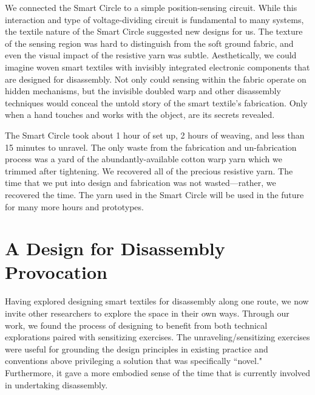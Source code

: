 We connected the Smart Circle to a simple position-sensing circuit. While this interaction and type of voltage-dividing circuit is fundamental to many systems, the textile nature of the Smart Circle suggested new designs for us. The texture of the sensing region was hard to distinguish from the soft ground fabric, and even the visual impact of the resistive yarn was subtle. Aesthetically, we could imagine woven smart textiles with invisibly integrated electronic components that are designed for disassembly. Not only could sensing within the fabric operate on hidden mechanisms, but the invisible doubled warp and other disassembly techniques would conceal the untold story of the smart textile's fabrication. Only when a hand touches and works with the object, are its secrets revealed.

The Smart Circle took about 1 hour of set up, 2 hours of weaving, and less than 15 minutes to unravel. The only waste from the fabrication and un-fabrication process was a yard of the abundantly-available cotton warp yarn which we trimmed after tightening. We recovered all of the precious resistive yarn. The time that we put into design and fabrication was not wasted---rather, we recovered the time. The yarn used in the Smart Circle will be used in the future for many more hours and prototypes.

\section{A Design for Disassembly Provocation}

Having explored designing smart textiles for disassembly along one route, we now invite other researchers to explore the space in their own ways. Through our work, we found the process of designing to benefit from both technical explorations paired with sensitizing exercises. The unraveling/sensitizing exercises were useful for grounding the design principles in existing practice and conventions above privileging a solution that was specifically ``novel." Furthermore, it gave a more embodied sense of the time that is currently involved in undertaking disassembly.

